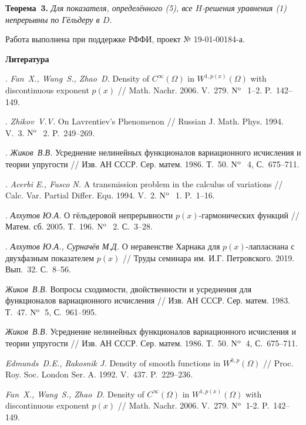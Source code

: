 \textbf{Теорема~3.} {\it Для показателя, определённого (5), все $H$-решения уравнения (1) непрерывны по Гёльдеру в $D$.}

\bigskip

Работа выполнена при поддержке РФФИ, проект № 19-01-00184-а.




\smallskip \centerline {\bf Литература} \nopagebreak

. {\it Fan~X., Wang~S., Zhao~D.} Density of $C^\infty(\Omega)$ in $W^{1,p(x)}(\Omega)$ with discontinuous exponent $p(x)$ // Math. Nachr. 2006. V.~279. ${\rm N^o}$\,~1--2. P.~142--149.

.  {\it Zhikov~V.V.} On Lavrentiev's Phenomenon // Russian J. Math. Phys. 1994. V.~3.  ${\rm N^o}$\,~2. P.~249--269.


. {\it Жиков~В.В.} Усреднение нелинейных функционалов вариационного исчисления и теории упругости // Изв. АН СССР.
Сер. матем. 1986. Т.~50. ${\rm N^o}$\,~4, С.~675--711.

. {\it Acerbi E., Fusco N.} A transmission problem in the calculus of variations // Calc. Var. Partial Differ. Equ. 1994. V.~2.  ${\rm N^o}$\,~1. P.~1--16.

. {\it Алхутов Ю.А.} О гёльдеровой непрерывности $p(x)$-гар\-мо\-ни\-ческих функций // Матем. сб. 2005. Т.~196. ${\rm N^o}$\,~2. С.~3--28.

. {\it Алхутов Ю.А., Сурначёв М.Д.} О неравенстве Харнака для $p(x)$-лапласиана с двухфазным показателем $p(x)$ // Труды семинара им. И.Г. Петровского. 2019. Вып.~32. С.~8--56.


\iffalse
{} \emph{Жиков~В.В.} Вопросы сходимости, двойственности и усреднения для функционалов вариационного исчисления // Изв. АН
СССР. Сер. матем. 1983. Т.~47. ${\rm N^o}$\, 5, С.~961--995.

 \emph{Жиков~В.В.} Усреднение нелинейных функционалов вариационного исчисления и теории упругости // Изв. АН СССР.
Сер. матем. 1986. Т.~50. ${\rm N^o}$\, 4, С.~675--711.

 \emph{Edmunds~D.E., Rakosnik J.} Density of smooth functions in $W^{k,p}(\Omega)$ // Proc. Roy. Soc. London Ser. A. 1992. V.~437. P.~229--236.

 \emph{Fan~X., Wang~S., Zhao~D.} Density of $C^\infty(\Omega)$ in $W^{1,p(x)}(\Omega)$ with discontinuous exponent $p(x)$ // Math. Nachr. 2006. V.~279. ${\rm N^o}$\, 1-2. P.~142--149.


